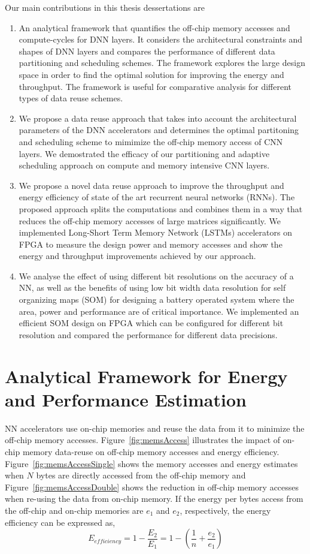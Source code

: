 \documentclass[a4paper,10pt]{article}
\begin{document}
Our main contributions in this thesis dessertations are
\begin{enumerate}
	\item An analytical framework that quantifies the off-chip memory accesses and compute-cycles for DNN layers. It considers the architectural constraints and shapes of DNN layers and compares the performance of different data partitioning and scheduling schemes. The framework explores the large design space in order to find the optimal solution for improving the energy and throughput. The framework is useful for comparative analysis for different types of data reuse schemes.
	\item We propose a data reuse approach that takes into account the architectural parameters of the DNN accelerators and determines the optimal partitoning and scheduling scheme to mimimize the off-chip memory access of CNN layers. We demostrated the efficacy of our partitioning and adaptive scheduling approach on compute and memory intensive CNN layers. 
	\item We propose a novel data reuse approach to improve the throughput and energy efficiency of state of the art recurrent neural networks (RNNs). The proposed approach splits the computations and combines them in a way that reduces the off-chip memory accesses of large matrices significantly. We implemented Long-Short Term Memory Network (LSTMs) accelerators on FPGA to measure the design power and memory accesses and show the energy and throughput improvements achieved by our approach.
	\item We analyse the effect of using different bit resolutions on the accuracy of a NN, as well as the benefits of using low bit width data resolution for self organizing maps (SOM) for designing a battery operated system where the area, power and performance are of critical importance. We implemented an efficient SOM design on FPGA which can be configured for different bit resolution and compared the performance for different data precisions.
\end{enumerate}
\section{Analytical Framework for Energy and Performance Estimation}
NN accelerators use on-chip memories and reuse the data from it to minimize the off-chip memory accesses. Figure~\ref{fig:memsAccess} illustrates the impact of on-chip memory data-reuse on off-chip memory accesses and energy efficiency. Figure~\ref{fig:memsAccessSingle} shows the memory accesses and energy estimates when $N$ bytes are directly accessed from the off-chip memory and Figure~\ref{fig:memsAccessDouble} shows the reduction in off-chip memory accesses when re-using the data from on-chip memory. If the energy per bytes access from the off-chip and on-chip memories are $e_{1}$ and $e_{2}$, respectively, the energy efficiency can be expressed as, 
\begin{equation}\label{e_efficiency}
	E_{efficiency}=1-\frac{E_2}{E_1}=1-(\frac{1}{n}+\frac{e_{2}}{e_{1}})
\end{equation}
\end{document}

